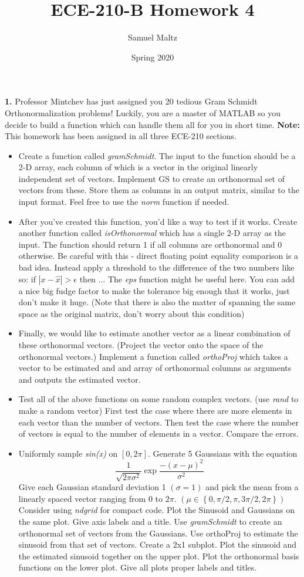 \documentclass[11pt]{article}
\title{ECE-210-B Homework 4}
\author{Samuel Maltz}
\date{Spring 2020}
\begin{document}
\noindent \textbf{1.} Professor Mintchev has just assigned you 20 tedious Gram Schmidt Orthonormalization problems!  Luckily, you are a master of MATLAB so you decide to build a function which can handle them all for you in short time. \textbf{Note:} This homework has been assigned in all three ECE-210 sections.
\begin{itemize}
\item 
Create a function called \emph{gramSchmidt}.  The input to the function should be a 2-D array, each column of which is a vector in the original linearly independent set of vectors. Implement GS to create an orthonormal set of vectors from these. Store them as columns in an output matrix, similar to the input format.  Feel free to use the \emph{norm} function if needed.

\item 
After you've created this function, you'd like a way to test if it works.  Create another function called \emph{isOrthonormal} which has a single 2-D array as the input.  The function should return 1 if all columns are orthonormal and 0 otherwise.  Be careful with this - direct floating point equality comparison is a bad idea.  Instead apply a threshold to the difference of the two numbers like so: if $|x-\hat{x}| > \epsilon$ then ... The \emph{eps} function might be useful here.  You can add a nice big fudge factor to make the tolerance big enough that it works, just don't make it huge.  (Note that there is also the matter of spanning the same space as the original matrix, don't worry about this condition)

\item
Finally, we would like to estimate another vector as a linear combination of these orthonormal vectors. (Project the vector onto the space of the orthonormal vectors.)  Implement a function called \emph{orthoProj} which takes a vector to be estimated and and array of orthonormal columns as arguments and outputs the estimated vector.

\item Test all of the above functions on some random complex vectors. (use \emph{rand} to make a random vector) First test the case where there are more elements in each vector than the number of vectors.  Then test the case where the number of vectors is equal to the number of elements in a vector.  Compare the errors.

\item Uniformly sample \emph{sin(x)} on $[0, 2\pi]$.  Generate 5 Gaussians with the equation
$$
\frac{1}{\sqrt{2\pi \sigma^2}}\exp{\frac{-(x-\mu)^2}{\sigma^2}}
$$
Give each Gaussian standard deviation 1 $(\sigma = 1)$ and pick the mean from a linearly spaced vector ranging from $0$ to $2\pi$. $(\mu \in \left\{0, \pi/2, \pi, 3\pi/2, 2\pi\right\})$ Consider using \emph{ndgrid} for compact code.  Plot the Sinusoid and Gaussians on the same plot.  Give axis labels and a title.  Use \emph{gramSchmidt} to create an orthonormal set of vectors from the Gaussians.  Use orthoProj to estimate the sinusoid from that set of vectors.  Create a 2x1 subplot.  Plot the sinusoid and the estimated sinusoid together on the upper plot.  Plot the orthonormal basis functions on the lower plot.  Give all plots proper labels and titles.
\end{itemize}
\end{document}
